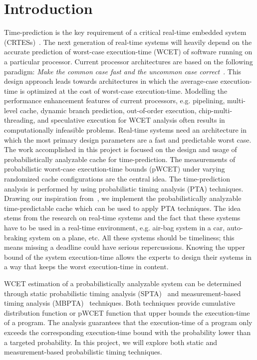 \section{Introduction}
\label{intro}
Time-prediction is the key requirement of a critical real-time embedded system (CRTESs)~\cite{Cazorla:2013:PPA:2465787.2465796}. The next generation of real-time systems will heavily depend on the accurate prediction of worst-case execution-time (WCET) of software running on a particular processor. Current processor architectures are based on the following paradigm: \textit{Make the common case fast and the uncommon case correct}~\cite{Schoeberl:2009:TCA:1540555.1554265}. This design approach leads towards architectures in which the average-case execution-time is optimized at the cost of worst-case execution-time. Modelling the performance enhancement features of current processors, e.g. pipelining, multi-level cache, dynamic branch prediction, out-of-order execution, chip-multi-threading, and speculative execution for WCET analysis often results in computationally infeasible problems. Real-time systems need an architecture in which the most primary design parameters are a fast and predictable worst case. The work accomplished in this project is focused on the design and usage of probabilistically analyzable cache for time-prediction. The measurements of probabilistic worst-case execution-time bounds (pWCET) under varying randomized cache configurations are the central idea. The time-prediction analysis is performed by using probabilistic timing analysis (PTA) techniques.
Drawing our inspiration from~\cite{Cazorla:2013:PPA:2465787.2465796}, we implement the probabilistically analyzable time-predictable cache which can be used to apply PTA techniques. The idea stems from the research on real-time systems and the fact that these systems have to be used in a real-time  environment, e.g. air-bag system in a car, auto-braking system on a plane, etc. All these systems should be timeliness; this means missing a deadline could have serious repercussions. Knowing the upper bound of the system execution-time allows the experts to design their systems in a way that keeps the worst execution-time in content.

WCET estimation of a probabilistically analyzable system can be determined through static probabilistic timing analysis (SPTA)~\cite{Griffin:2014:SPT:2659787.2659809} and measurement-based timing analysis (MBPTA)~\cite{cucu2012measurement} techniques. Both techniques provide cumulative distribution function or pWCET function that upper bounds the execution-time of a program. The analysis guarantees that the execution-time of a program only exceeds the corresponding execution-time bound with the probability lower than a targeted probability. In this project, we will explore both static and measurement-based probabilistic timing techniques. 


